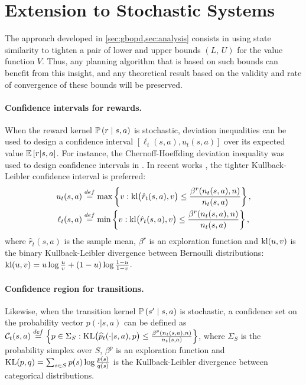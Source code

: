 \documentclass[runningheads]{llncs}
\begin{document}
\section{Extension to Stochastic Systems}
\label{sec:stochastic}

The approach developed in \cref{sec:gbopd,sec:analysis} consists in using state similarity to tighten a pair of lower and upper bounds $(L,\,U)$ for the value function $V$. Thus, any planning algorithm that is based on such bounds can benefit from this insight, and any theoretical result based on the validity and rate of convergence of these bounds will be preserved.  

\paragraph{Confidence intervals for rewards.}

When the reward kernel $\mathbb{P}\left(r \;\middle|\; s,a\right)$ is stochastic, deviation inequalities can be used to design a confidence interval $[\ell_t(s,a), u_t(s,a)]$ over its expected value $\operatorname*{\mathbb{E}}\left[r | s,a\right]$. For instance, the Chernoff-Hoeffding deviation inequality was used to design confidence intervals in \citep{Kocsis06UCT,Bubeck2010open,Kaufmann2017}.
In recent works \citep{Leurent2019practical, MDPGapE2020}, the tighter Kullback-Leibler confidence interval is preferred:
\begin{align*}
u_t(s,a) &\stackrel{def}{=} \max \left\{v : \operatorname{kl}\!\big(\hat{r}_t(s,a),v\big) \leq \frac {\beta^r(n_t(s,a), n)} {n_t(s,a)} \right\},\\
\ell_t(s,a) &\stackrel{def}{=}\min \left\{v : \operatorname{kl}\!\big(\hat{r}_t(s,a),v\big) \leq \frac {\beta^r(n_t(s,a), n)} {n_t(s,a)} \right\},
\end{align*}
where $\hat{r}_t(s,a)$ is the sample mean, $\beta^r$ is an exploration function and $\operatorname{kl}(u,v)$ is the binary Kullback-Leibler divergence between Bernoulli distributions: $\operatorname{kl}(u,v) = u \log \tfrac {u} {v} + (1-u) \log \tfrac {1-u} {1-v}$.

\paragraph{Confidence region for transitions.}

Likewise, when the transition kernel $\mathbb{P}\left(s' \;\middle|\; s,a\right)$ is stochastic, a confidence set on the probability vector $p(\cdot|s,a)$ can be defined as
$\mathcal{C}_t(s,a) \stackrel{def}{=} \left\{p\in \Sigma_S :  \operatorname{KL}\!\big(\widehat{p}_t(\cdot|s,a),p\big) \leq \frac {\beta^p(n_t(s,a), n)} {n_t(s,a)}\right\}$,
where $\Sigma_S$ is the probability simplex over $S$, $\beta^p$ is an exploration function and $\operatorname{KL}(p,q)= \sum_{s \in S}  p(s) \log \tfrac{ p(s)} {{q}(s)}$ is the Kullback-Leibler divergence between categorical distributions.
\end{document}
